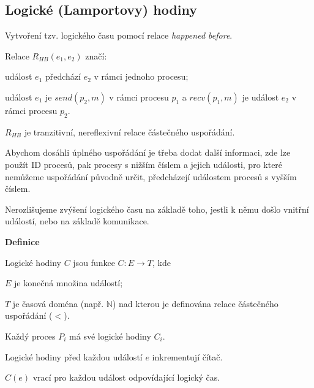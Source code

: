 \subsection{Logické (Lamportovy) hodiny}

\begin{compactitem}
    \item Vytvoření tzv. logického času pomocí relace \textit{happened before}. \begin{compactitem}
        \item Relace $R_{HB}(e_1, e_2)$ značí: \begin{compactitem}
            \item událost $e_1$ předchází $e_2$ v rámci jednoho procesu;
            \item událost $e_1$ je $send(p_2, m)$ v rámci procesu $p_1$ a $recv(p_1, m)$ je událost $e_2$ v rámci procesu $p_2$.
        \end{compactitem}

        \item $R_{HB}$ je tranzitivní, nereflexivní relace částečného uspořádání.

        \item Abychom dosáhli úplného uspořádání je třeba dodat další informaci, zde lze použít ID procesů, pak procesy s nižším číslem  a jejich události, pro které nemůžeme uspořádání původně určit, předcházejí událostem procesů s vyšším číslem.

        \item Nerozlišujeme zvýšení logického času na základě toho, jestli k němu došlo vnitřní událostí, nebo na základě komunikace.
    \end{compactitem}

    \item \textbf{Definice} \begin{compactitem}
        \item Logické hodiny $C$ jsou funkce $C : E \rightarrow T$, kde \begin{compactitem}
            \item $E$ je konečná množina událostí;
            \item $T$ je časová doména (např. $\mathbb{N}$) nad kterou je definována relace částečného uspořádání ($<$).
        \end{compactitem}

        \item Každý proces $P_i$ má své logické hodiny $C_i$.
        \item Logické hodiny před každou událostí $e$ inkrementují čítač.
        \item $C(e)$ vrací pro každou událost odpovídající logický čas.


\end{compactitem}
\end{compactitem}
